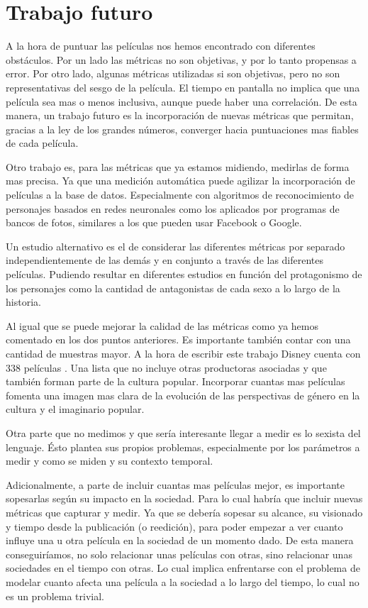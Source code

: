 \noindent %
\chapter{Trabajo futuro}
A la hora de puntuar las películas nos hemos encontrado con diferentes obstáculos. Por un lado las métricas no son objetivas, y por lo tanto propensas a error. Por otro lado, algunas métricas utilizadas si son objetivas, pero no son representativas del sesgo de la película. El tiempo en pantalla no implica que una película sea mas o menos inclusiva, aunque puede haber una correlación. De esta manera, un trabajo futuro es la incorporación de nuevas métricas que permitan, gracias a la ley de los grandes números, converger hacia puntuaciones mas fiables de cada película.

Otro trabajo es, para las métricas que ya estamos midiendo, medirlas de forma mas precisa. Ya que una medición automática puede agilizar la incorporación de películas a la base de datos. Especialmente con algoritmos de reconocimiento de personajes basados en redes neuronales como los aplicados por programas de bancos de fotos, similares a los que pueden usar Facebook o Google.

Un estudio alternativo es el de considerar las diferentes métricas por separado independientemente de las demás y en conjunto a través de las diferentes películas. Pudiendo resultar en diferentes estudios en función del protagonismo de los personajes como la cantidad de antagonistas de cada sexo a lo largo de la historia.

Al igual que se puede mejorar la calidad de las métricas como ya hemos comentado en los dos puntos anteriores. Es importante también contar con una cantidad de muestras mayor. A la hora de escribir este trabajo Disney cuenta con 338 películas \cite{listaDisney}. Una lista que no incluye otras productoras asociadas y que también forman parte de la cultura popular. Incorporar cuantas mas películas fomenta una imagen mas clara de la evolución de las perspectivas de género en la cultura y el imaginario popular.

Otra parte que no medimos y que sería interesante llegar a medir es lo sexista del lenguaje. Ésto plantea sus propios problemas, especialmente por los parámetros a medir y como se miden y su contexto temporal.

Adicionalmente, a parte de incluir cuantas mas películas mejor, es importante sopesarlas según su impacto en la sociedad. Para lo cual habría que incluir nuevas métricas que capturar y medir. Ya que se debería sopesar su alcance, su visionado y tiempo desde la publicación (o reedición), para poder empezar a ver cuanto influye una u otra película en la sociedad de un momento dado. De esta manera conseguiríamos, no solo relacionar unas películas con otras, sino relacionar unas sociedades en el tiempo con otras. Lo cual implica enfrentarse con el problema de modelar cuanto afecta una película a la sociedad a lo largo del tiempo, lo cual no es un problema trivial. 
